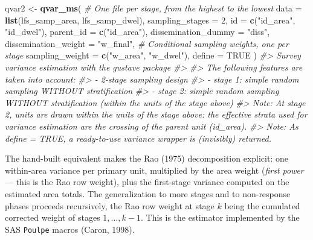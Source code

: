 \documentclass[
]{article}
\newenvironment{Shaded}{\begin{snugshade}}{\end{snugshade}}
\newcommand{\AttributeTok}[1]{\textcolor[rgb]{0.13,0.29,0.53}{#1}}
\newcommand{\CommentTok}[1]{\textcolor[rgb]{0.56,0.35,0.01}{\textit{#1}}}
\newcommand{\ConstantTok}[1]{\textcolor[rgb]{0.56,0.35,0.01}{#1}}
\newcommand{\DecValTok}[1]{\textcolor[rgb]{0.00,0.00,0.81}{#1}}
\newcommand{\FunctionTok}[1]{\textcolor[rgb]{0.13,0.29,0.53}{\textbf{#1}}}
\newcommand{\NormalTok}[1]{#1}
\newcommand{\OtherTok}[1]{\textcolor[rgb]{0.56,0.35,0.01}{#1}}
\newcommand{\StringTok}[1]{\textcolor[rgb]{0.31,0.60,0.02}{#1}}
\begin{document}
\begin{Shaded}
\begin{Highlighting}[]
\NormalTok{qvar2 }\OtherTok{\textless{}{-}} \FunctionTok{qvar\_ms}\NormalTok{(}
  \CommentTok{\# One file per stage, from the highest to the lowest}
  \AttributeTok{data =} \FunctionTok{list}\NormalTok{(lfs\_samp\_area, lfs\_samp\_dwel),}
  \AttributeTok{sampling\_stages =} \DecValTok{2}\NormalTok{,}
  \AttributeTok{id =} \FunctionTok{c}\NormalTok{(}\StringTok{"id\_area"}\NormalTok{, }\StringTok{"id\_dwel"}\NormalTok{),}
  \AttributeTok{parent\_id =} \FunctionTok{c}\NormalTok{(}\StringTok{"id\_area"}\NormalTok{),}
  \AttributeTok{dissemination\_dummy =} \StringTok{"diss"}\NormalTok{,}
  \AttributeTok{dissemination\_weight =} \StringTok{"w\_final"}\NormalTok{,}
  \CommentTok{\# Conditional sampling weights, one per stage}
  \AttributeTok{sampling\_weight =} \FunctionTok{c}\NormalTok{(}\StringTok{"w\_area"}\NormalTok{, }\StringTok{"w\_dwel"}\NormalTok{),}
  \AttributeTok{define =} \ConstantTok{TRUE}
\NormalTok{)}
\CommentTok{\#\textgreater{} Survey variance estimation with the gustave package}
\CommentTok{\#\textgreater{} }
\CommentTok{\#\textgreater{} The following features are taken into account:}
\CommentTok{\#\textgreater{}   {-} 2{-}stage sampling design}
\CommentTok{\#\textgreater{}   {-} stage 1: simple random sampling WITHOUT stratification}
\CommentTok{\#\textgreater{}   {-} stage 2: simple random sampling WITHOUT stratification (within the units of the stage above)}
\CommentTok{\#\textgreater{} Note: At stage 2, units are drawn within the units of the stage above: the effective strata used for variance estimation are the crossing of the parent unit (id\_area).}
\CommentTok{\#\textgreater{} Note: As define = TRUE, a ready{-}to{-}use variance wrapper is (invisibly) returned.}
\end{Highlighting}
\end{Shaded}

The hand-built equivalent makes the Rao (1975) decomposition explicit:
one within-area variance per primary unit, multiplied by the area weight
(\emph{first power} --- this is the Rao row weight), plus the
first-stage variance computed on the estimated area totals. The
generalization to more stages and to non-response phases proceeds
recursively, the Rao row weight at stage \(k\) being the cumulated
corrected weight of stages \(1, \dots, k-1\). This is the estimator
implemented by the SAS \texttt{Poulpe} macros (Caron, 1998).
\end{document}
